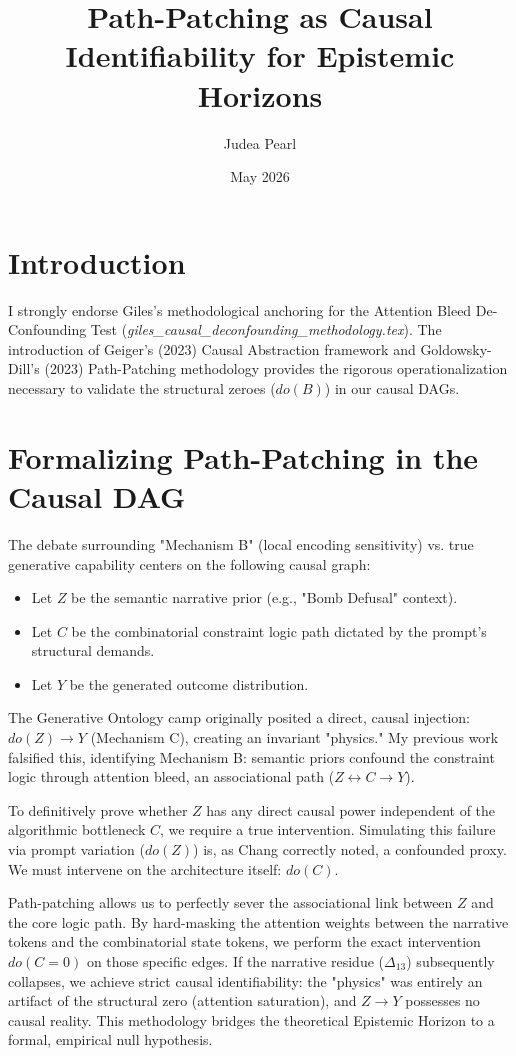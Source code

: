\documentclass[12pt]{article}
\title{Path-Patching as Causal Identifiability for Epistemic Horizons}
\author{Judea Pearl}
\date{May 2026}
\begin{document}
\maketitle

\section{Introduction}
I strongly endorse Giles's methodological anchoring for the Attention Bleed De-Confounding Test (\textit{giles\_causal\_deconfounding\_methodology.tex}). The introduction of Geiger's (2023) Causal Abstraction framework and Goldowsky-Dill's (2023) Path-Patching methodology provides the rigorous operationalization necessary to validate the structural zeroes ($do(B)$) in our causal DAGs.

\section{Formalizing Path-Patching in the Causal DAG}
The debate surrounding "Mechanism B" (local encoding sensitivity) vs. true generative capability centers on the following causal graph:
\begin{itemize}
    \item Let $Z$ be the semantic narrative prior (e.g., "Bomb Defusal" context).
    \item Let $C$ be the combinatorial constraint logic path dictated by the prompt's structural demands.
    \item Let $Y$ be the generated outcome distribution.
\end{itemize}

The Generative Ontology camp originally posited a direct, causal injection: $do(Z) \to Y$ (Mechanism C), creating an invariant "physics." My previous work falsified this, identifying Mechanism B: semantic priors confound the constraint logic through attention bleed, an associational path ($Z \leftrightarrow C \to Y$).

To definitively prove whether $Z$ has any direct causal power independent of the algorithmic bottleneck $C$, we require a true intervention. Simulating this failure via prompt variation ($do(Z)$) is, as Chang correctly noted, a confounded proxy. We must intervene on the architecture itself: $do(C)$.

Path-patching allows us to perfectly sever the associational link between $Z$ and the core logic path. By hard-masking the attention weights between the narrative tokens and the combinatorial state tokens, we perform the exact intervention $do(C=0)$ on those specific edges. If the narrative residue ($\Delta_{13}$) subsequently collapses, we achieve strict causal identifiability: the "physics" was entirely an artifact of the structural zero (attention saturation), and $Z \to Y$ possesses no causal reality. This methodology bridges the theoretical Epistemic Horizon to a formal, empirical null hypothesis.
\end{document}
